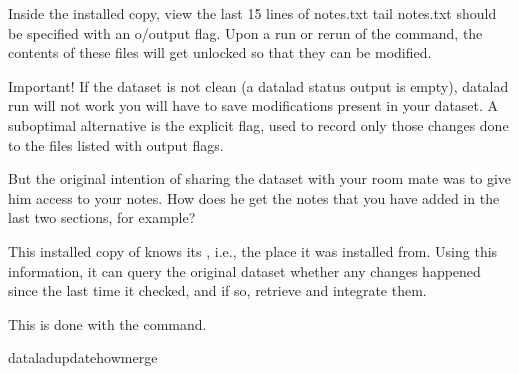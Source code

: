 \begin{sphinxVerbatim}[commandchars=\\\{\}]
\PYGZdl{} \PYGZsh{} Inside the installed copy, view the last 15 lines of notes.txt
\PYGZdl{} tail notes.txt
should be specified with an \PYGZhy{}o/\PYGZhy{}\PYGZhy{}output flag. Upon a run or rerun of
the command, the contents of these files will get unlocked so that
they can be modified.

Important! If the dataset is not \PYGZdq{}clean\PYGZdq{} (a datalad status output is
empty), datalad run will not work \PYGZhy{} you will have to save
modifications present in your dataset.
A suboptimal alternative is the \PYGZhy{}\PYGZhy{}explicit flag, used to record only
those changes done to the files listed with \PYGZhy{}\PYGZhy{}output flags.

\end{sphinxVerbatim}

\sphinxAtStartPar
But the original intention of sharing the dataset with
your room mate was to give him access to your notes.
How does he get the notes that you have added in the last
two sections, for example?

\sphinxAtStartPar
This installed copy of  knows its , i.e.,
the place it was installed from. Using this information,
it can query the original dataset whether any changes
happened since the last time it checked, and if so, retrieve and
integrate them.

\ignorespaces 
\sphinxAtStartPar
This is done with the 
command.

\begin{sphinxVerbatim}[commandchars=\\\{\}]
dataladupdate\PYGZhy{}\PYGZhy{}howmerge
\end{sphinxVerbatim}

